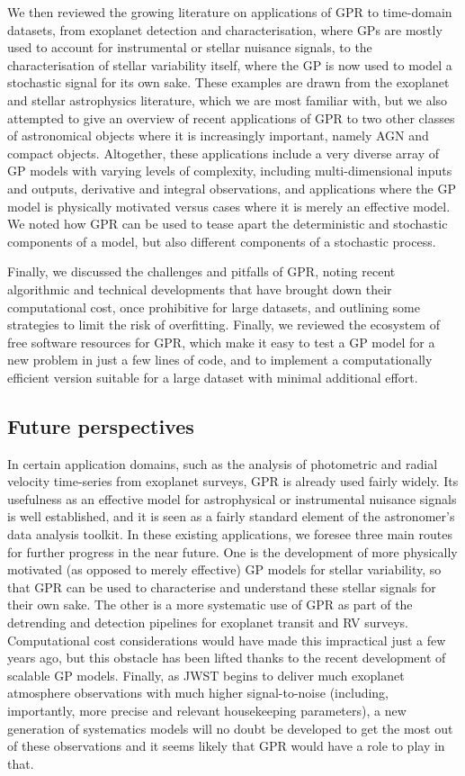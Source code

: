 \documentclass[letterpaper]{ar-1col}
\begin{document}
We then reviewed the growing literature on applications of GPR to time-domain datasets, from exoplanet detection and characterisation, where GPs are mostly used to account for instrumental or stellar nuisance signals, to the characterisation of stellar variability itself, where the GP is now used to model a stochastic signal for its own sake. These examples are drawn from the exoplanet and stellar astrophysics literature, which we are most familiar with, but we also attempted to give an overview of recent applications of GPR to two other classes of astronomical objects where it is increasingly important, namely AGN and compact objects. Altogether, these applications include a very diverse array of GP models with varying levels of complexity, including multi-dimensional inputs and outputs, derivative and integral observations, and applications where the GP model is physically motivated versus cases where it is merely an effective model. We noted how GPR can be used to tease apart the deterministic and stochastic components of a model, but also different components of a stochastic process. 

Finally, we discussed the challenges and pitfalls of GPR, noting recent algorithmic and technical developments that have brought down their computational cost, once prohibitive for large datasets, and outlining some strategies to limit the risk of overfitting. Finally, we reviewed the ecosystem of free software resources for GPR, which make it easy to test a GP model for a new problem in just a few lines of code, and to implement a computationally efficient version suitable for a large dataset with minimal additional effort. 

\subsection{Future perspectives}

In certain application domains, such as the analysis of photometric and radial velocity time-series from exoplanet surveys, GPR is already used fairly widely. Its usefulness as an effective model for astrophysical or instrumental nuisance signals is well established, and it is seen as a fairly standard element of the astronomer's data analysis toolkit. In these existing applications, we foresee three main routes for further progress in the near future. One is the development of more physically motivated (as opposed to merely effective) GP models for stellar variability, so that GPR can be used to characterise and understand these stellar signals for their own sake. The other is a more systematic use of GPR as part of the detrending and detection pipelines for exoplanet transit and RV surveys. Computational cost considerations would have made this impractical just a few years ago, but this obstacle has been lifted thanks to the recent development of scalable GP models. Finally, as JWST begins to deliver much exoplanet atmosphere observations with much higher signal-to-noise (including, importantly, more precise and relevant housekeeping parameters), a new generation of systematics models will no doubt be developed to get the most out of these observations and it seems likely that GPR would have a role to play in that.
\end{document}
